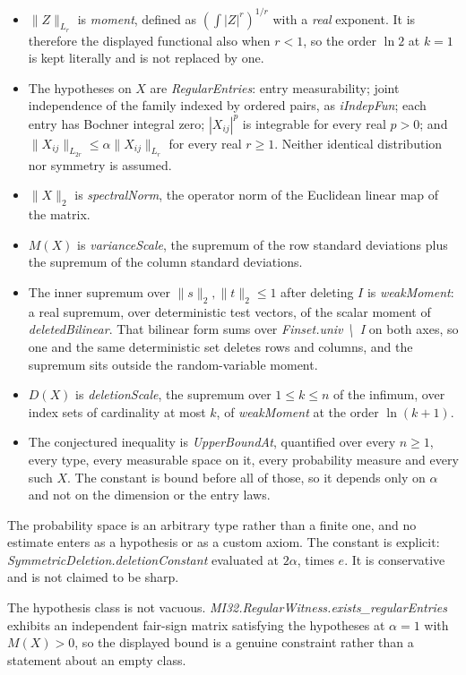\documentclass[11pt,a4paper]{article}
\providecommand{\tightlist}{\setlength{\itemsep}{0pt}\setlength{\parskip}{0pt}}
\begin{document}
\begin{itemize}
\tightlist
\item
  \(\|Z\|_{L_r}\) is \textit{moment}, defined as \((\int|Z|^r)^{1/r}\)
  with a \emph{real} exponent. It is therefore the displayed functional
  also when \(r<1\), so the order \(\ln2\) at \(k=1\) is kept literally
  and is not replaced by one.
\item
  The hypotheses on \(X\) are \textit{RegularEntries}: entry
  measurability; joint independence of the family indexed by ordered
  pairs, as \textit{iIndepFun}; each entry has Bochner integral zero;
  \(|X_{ij}|^p\) is integrable for every real \(p>0\); and
  \(\|X_{ij}\|_{L_{2r}}\le\alpha\|X_{ij}\|_{L_r}\) for every real
  \(r\ge1\). Neither identical distribution nor symmetry is assumed.
\item
  \(\|X\|_2\) is \textit{spectralNorm}, the operator norm of the
  Euclidean linear map of the matrix.
\item
  \(M(X)\) is \textit{varianceScale}, the supremum of the row standard
  deviations plus the supremum of the column standard deviations.
\item
  The inner supremum over \(\|s\|_2,\|t\|_2\le1\) after deleting \(I\)
  is \textit{weakMoment}: a real supremum, over deterministic test
  vectors, of the scalar moment of \textit{deletedBilinear}. That
  bilinear form sums over \textit{Finset.univ \textbackslash{}\ I} on
  both axes, so one and the same deterministic set deletes rows and
  columns, and the supremum sits outside the random-variable moment.
\item
  \(D(X)\) is \textit{deletionScale}, the supremum over \(1\le k\le n\)
  of the infimum, over index sets of cardinality at most \(k\), of
  \textit{weakMoment} at the order \(\ln(k+1)\).
\item
  The conjectured inequality is \textit{UpperBoundAt}, quantified over
  every \(n\ge1\), every type, every measurable space on it, every
  probability measure and every such \(X\). The constant is bound before
  all of those, so it depends only on \(\alpha\) and not on the
  dimension or the entry laws.
\end{itemize}

The probability space is an arbitrary type rather than a finite one, and
no estimate enters as a hypothesis or as a custom axiom. The constant is
explicit: \textit{SymmetricDeletion.deletionConstant} evaluated at
\(2\alpha\), times \(e\). It is conservative and is not claimed to be
sharp.

The hypothesis class is not vacuous.
\textit{MI32.RegularWitness.exists\_regularEntries} exhibits an
independent fair-sign matrix satisfying the hypotheses at \(\alpha=1\)
with \(M(X)>0\), so the displayed bound is a genuine constraint rather
than a statement about an empty class.
\end{document}
